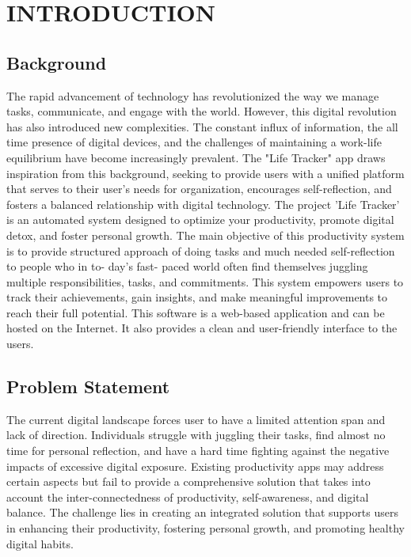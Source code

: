 \section{INTRODUCTION}
\subsection{Background}

The rapid advancement of technology has revolutionized the way we manage tasks, communicate, and engage with the world. However, this digital revolution has also introduced new complexities. The constant influx of information, the all time presence of digital devices, and the challenges of maintaining a work-life equilibrium have become increasingly prevalent. The "Life Tracker" app draws inspiration from this background, seeking to provide users with a unified platform that serves to their user's needs for organization, encourages self-reflection, and fosters a balanced relationship with digital technology. The project ’Life Tracker’ is an automated system designed to optimize
your productivity, promote digital detox, and foster personal growth.
The main objective of this productivity system is to provide structured approach
of doing tasks and much needed self-reflection to people who in to-
day’s fast- paced world often find themselves juggling multiple responsibilities, tasks, and commitments. This system empowers users to track their
achievements, gain insights, and make meaningful improvements to reach
their full potential.
This software is a web-based application and can be hosted on the Internet.
It also provides a clean and user-friendly interface to the users.

\subsection{Problem Statement}
The current digital landscape forces user to have a limited attention span and lack of direction. Individuals struggle with juggling their tasks, find almost no time for personal reflection, and have a hard time fighting against the negative impacts of excessive digital exposure. Existing productivity apps may address certain aspects but fail to provide a comprehensive solution that takes into account the inter-connectedness of productivity, self-awareness, and digital balance. The challenge lies in creating an integrated solution that supports users in enhancing their productivity, fostering personal growth, and promoting healthy digital habits.



